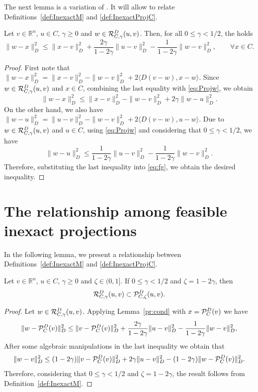 The  next lemma is a variation of \cite[Lemma 6]{Reiner_Orizon_Leandro2019}.  It will allow to relate Definitions~\ref{def:InexactM} and \ref{def:InexactProjC}.
\begin{lemma} \label{pr:cond}
	Let $v \in {\mathbb R}^n$, $u \in C$, $\gamma \geq 0$ and $w\in {\cal R}_{C,\gamma}^{D}(u, v)$. Then,  for all $0 \leq \gamma <1/2$, the holds
	$$
		\displaystyle \|w-x\|_{D}^2 \leq \|x-v\|_{D}^2 + \frac{2\gamma}{1-2\gamma}\|u-v\|_{D}^2- \frac{1}{1-2\gamma}\|w-v\|_{D}^2, \qquad \forall x \in C.
	$$
\end{lemma}
\begin{proof}
	First note that $\|w-x\|_{D}^2 = \|x-v\|_{D}^2 - \|w-v\|_{D}^2 + 2 \langle D(v-w), x-w \rangle$. Since $w \in {\cal R}_{C,\gamma}^{D}(u, v)$ and $x \in C$, combining the last equality with \eqref{eq:Projw}, we obtain
	\begin{equation} \label{eq:fg}
		\|w-x\|_{D}^2 \leq \|x-v\|_{D}^2 - \|w-v\|_{D}^2  + 2\gamma \|w-u\|_{D}^2.
	\end{equation}
	On the other hand, we also have $\|w-u\|_{D}^2=\|u-v\|_{D}^2 - \|w-v\|_{D}^2 +  2 \langle D(v-w), u-w \rangle$. Due to $w\in {\cal R}_{C,\gamma}^{D}(u, v)$ and $u \in C$, using \eqref{eq:Projw} and considering that  $0 \leq \gamma < 1/2$, we have
	$$
		\|w-u\|_{D}^2 \leq \frac{1}{1-2\gamma}\|u-v\|_{D}^2 - \frac{1}{1-2\gamma} \|w-v\|_{D}^2.
	$$
	Therefore, substituting the last inequality into   \eqref{eq:fg}, we obtain the  desired inequality.
\end{proof}

\section{The relationship among feasible inexact projections}

In the following  lemma, we present a  relationship between   Definitions~\ref{def:InexactM} and \ref{def:InexactProjC}.
\begin{lemma} \label{pr:condrip}
	Let $v \in {\mathbb R}^n$, $u \in C$, $\gamma \geq 0$  and $\zeta\in (0, 1]$.  If  $0 \leq \gamma <1/2$ and $\zeta=1-2\gamma$, then
	$$
		{\cal R}_{C,\gamma}^{D}(u, v) \subset {\cal P}_{C,\zeta}^{D}(u, v).
	$$
\end{lemma}
\begin{proof}
	Let $w\in {\cal R}_{C,\gamma}^{D}(u, v)$. Applying Lemma~\ref{pr:cond} with  $x={\cal P}_{C}^{D}(v)$ we have
	$$
		\|w-{\cal P}_{C}^{D}(v)\|_{D}^2 \leq \|v-{\cal P}_{C}^{D}(v)\|_{D}^2 + \frac{2\gamma}{1-2\gamma}\|u-v\|_{D}^2- \frac{1}{1-2\gamma}\|w-v\|_{D}^2,
	$$
	After some algebraic manipulations in the last inequality we obtain that
	$$
		\|w-v\|_{D}^2 \leq (1-2\gamma)\|v-{\cal P}_{C}^{D}(v)\|_{D}^2 + 2\gamma\|u-v\|_{D}^2- (1-2\gamma)\|w-{\cal P}_{C}^{D}(v)\|_{D}^2.
	$$
	Therefore, considering that  $0 \leq \gamma <1/2$ and $\zeta=1-2\gamma$, the result follows from Definition~\ref{def:InexactM}.
\end{proof}

